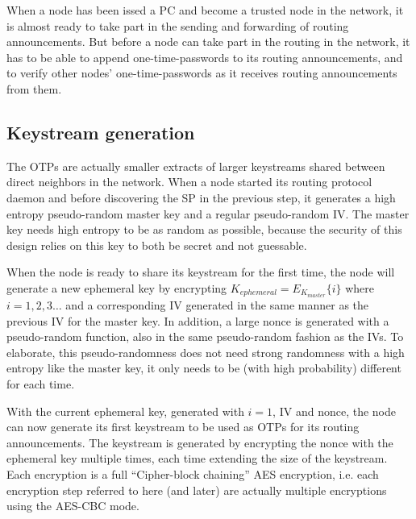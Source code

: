 

When a node has been issed a \ac{PC} and become a trusted node in the network,
it is almost ready to take part in the sending and forwarding of routing
announcements. But before a node can take part in the routing in the network, it
has to be able to append one-time-passwords to its routing announcements, and to
verify other nodes' one-time-passwords as it receives routing announcements from
them.

\subsection{Keystream generation}
The \acp{OTP} are actually smaller extracts of larger keystreams shared
between direct neighbors in the network. When a node started its routing
protocol daemon and before discovering the \ac{SP} in the previous step, it
generates a high entropy pseudo-random master key and a regular pseudo-random
\ac{IV}. The master key needs high entropy to be as random as possible, because
the security of this design relies on this key to both be secret and not
guessable.

When the node is ready to share its keystream for the first time, the node will
generate a new ephemeral key by encrypting $K_{ephemeral} =
E_{K_{master}}\{i\}$ where $i = 1,2,3\ldots$ and a corresponding \ac{IV}
generated in the same manner as the previous \ac{IV} for the master key. In
addition, a large nonce is generated with a pseudo-random function, also in the
same pseudo-random fashion as the \acp{IV}. To elaborate, this pseudo-randomness
does not need strong randomness with a high entropy like the master key, it only
needs to be (with high probability) different for each time.

With the current ephemeral key, generated with $i = 1$, \ac{IV} and nonce, the
node can now generate its first keystream to be used as \acp{OTP} for its
routing announcements. The keystream is generated by encrypting the nonce with
the ephemeral key multiple times, each time extending the size of the
keystream. Each encryption is a full ``Cipher-block chaining'' AES encryption,
i.e. each encryption step referred to here (and later) are actually multiple
encryptions using the AES-CBC mode.

